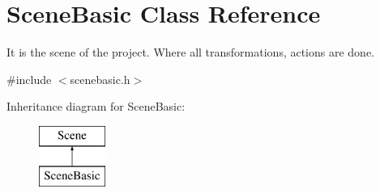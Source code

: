 \hypertarget{class_scene_basic}{}\section{Scene\+Basic Class Reference}
\label{class_scene_basic}


It is the scene of the project. Where all transformations, actions are done.  




{\ttfamily \#include $<$scenebasic.\+h$>$}

Inheritance diagram for Scene\+Basic\+:\begin{figure}[H]
\begin{center}
\leavevmode
\includegraphics[height=2.000000cm]{class_scene_basic}
\end{center}
\end{figure}
